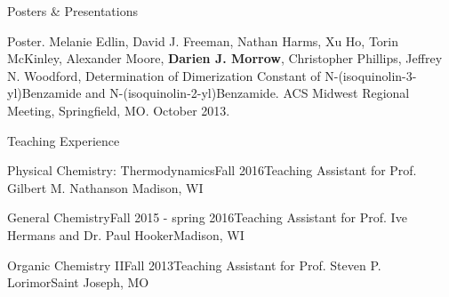 \documentclass{resume} %
\begin{document}
\begin{rSection}{Posters \& Presentations}
\begin{etaremune}
	
	\item Poster. Melanie Edlin, David J. Freeman, Nathan Harms, Xu Ho, Torin McKinley, Alexander Moore, \textbf{Darien J. Morrow}, Christopher Phillips, Jeffrey N. Woodford, Determination of Dimerization Constant of N-(isoquinolin-3-yl)Benzamide and N-(isoquinolin-2-yl)Benzamide. ACS Midwest Regional Meeting, Springfield, MO. October 2013.
	
	
\end{etaremune}
\end{rSection}



\begin{rSection}{Teaching Experience}
	
\begin{rSubsectionlistless}{Physical Chemistry: Thermodynamics}{Fall 2016}{Teaching Assistant for Prof. Gilbert M. Nathanson }{Madison, WI}
\end{rSubsectionlistless}

\begin{rSubsectionlistless}{General Chemistry}{Fall 2015 - spring 2016}{Teaching Assistant for Prof. Ive Hermans and Dr. Paul Hooker}{Madison, WI}
\end{rSubsectionlistless}

\begin{rSubsectionlistless}{Organic Chemistry II}{Fall 2013}{Teaching Assistant for Prof. Steven P. Lorimor}{Saint Joseph, MO}
\end{rSubsectionlistless}

\end{rSection}
\end{document}

